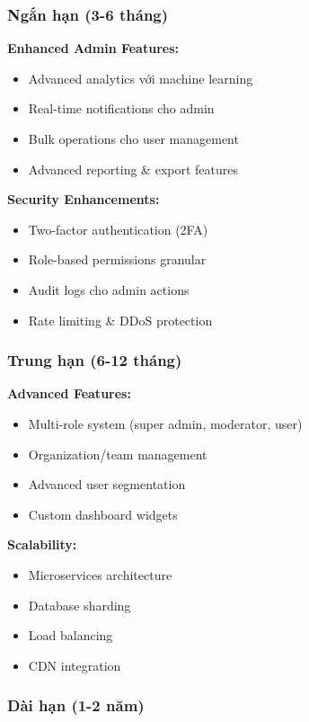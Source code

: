 \documentclass[12pt,a4paper]{article}
\begin{document}
\subsubsection{Ngắn hạn (3-6 tháng)}

\textbf{Enhanced Admin Features:}
\begin{itemize}
    \item Advanced analytics với machine learning
    \item Real-time notifications cho admin
    \item Bulk operations cho user management
    \item Advanced reporting \& export features
\end{itemize}

\textbf{Security Enhancements:}
\begin{itemize}
    \item Two-factor authentication (2FA)
    \item Role-based permissions granular
    \item Audit logs cho admin actions
    \item Rate limiting \& DDoS protection
\end{itemize}

\subsubsection{Trung hạn (6-12 tháng)}

\textbf{Advanced Features:}
\begin{itemize}
    \item Multi-role system (super admin, moderator, user)
    \item Organization/team management
    \item Advanced user segmentation
    \item Custom dashboard widgets
\end{itemize}

\textbf{Scalability:}
\begin{itemize}
    \item Microservices architecture
    \item Database sharding
    \item Load balancing
    \item CDN integration
\end{itemize}

\subsubsection{Dài hạn (1-2 năm)}
\end{document}

